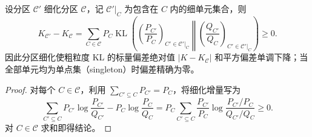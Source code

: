 \documentclass[lang=cn,scheme=chinese,openany]{elegantbook}
\newcommand{\KL}{\operatorname{KL}}
\begin{document}
\begin{proposition}[分区细化的标量单调性]
\label{inf:prop:kl-partition-refinement}
设分区 $\mathcal C'$ 细化分区 $\mathcal C$，记 $\mathcal C'|_C$ 为包含在 $C$ 内的细单元集合，则
\begin{equation*}
 K_{\mathcal C'}-K_{\mathcal C}
 =\sum_{C\in\mathcal C}P_C
   \KL\left(
       \left(\frac{P_{C'}}{P_C}\right)_{C'\in\mathcal C'|_C}
       \middle\Vert
       \left(\frac{Q_{C'}}{Q_C}\right)_{C'\in\mathcal C'|_C}
      \right)\geq0.
\end{equation*}
因此分区细化使粗粒度 KL 的标量偏差绝对值 $|K-K_{\mathcal C}|$ 和平方偏差单调下降；当全部单元均为单点集（singleton）时偏差精确为零。
\end{proposition}
\begin{proof}
对每个 $C\in\mathcal C$，利用 $\sum_{C'\subseteq C}P_{C'}=P_C$，将细化增量写为
\begin{equation*}
 \sum_{C'\subseteq C}P_{C'}\log\frac{P_{C'}}{Q_{C'}}
    -P_C\log\frac{P_C}{Q_C}
 =P_C\sum_{C'\subseteq C}\frac{P_{C'}}{P_C}
       \log\frac{P_{C'}/P_C}{Q_{C'}/Q_C}\ge 0.
\end{equation*}
对 $C\in\mathcal C$ 求和即得结论。
\end{proof}
\end{document}

